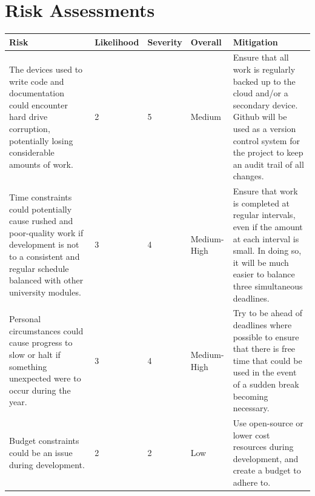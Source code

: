 \documentclass[12pt]{report}
\begin{document}
    \section{Risk Assessments}\label{sec:risks}
    \begin{table}[H]
        \centering
        \begin{tabular}{ |p{}|p{}|p{}|p{}|p{}|}
            \hline
            \cellcolor{blue!25}Risk & \cellcolor{blue!25}Likelihood  &
            \cellcolor{blue!25}Severity & \cellcolor{blue!25}Overall & \cellcolor{blue!25}Mitigation\\
            \hline

            The devices used to write code and documentation could encounter hard drive corruption, potentially 
            losing considerable amounts of work. & 2 & 5 & Medium & Ensure that all work is regularly backed up to 
            the cloud and/or a secondary device. Github will be used as a version control system for the project 
            to keep an audit trail of all changes.\\
           
            \hline

            Time constraints could potentially cause rushed and poor-quality work if development is not to a 
            consistent and regular schedule balanced with other university modules. & 3 & 4 & Medium-High &
            Ensure that work is completed at regular intervals, even if the amount at each interval is small. 
            In doing so, it will be much easier to balance three simultaneous deadlines. \\

            \hline

            Personal circumstances could cause progress to slow or halt if something unexpected were to occur
            during the year. & 3 & 4 & Medium-High & Try to be ahead of deadlines where possible to ensure that
            there is free time that could be used in the event of a sudden break becoming necessary.\\
            
            \hline

            Budget constraints could be an issue during development. & 2 & 2 & Low & Use open-source or lower
            cost resources during development, and create a budget to adhere to. \\ 
            
            \hline

            

        \end{tabular}\label{tab:risks}
    \end{table}
\end{document}

